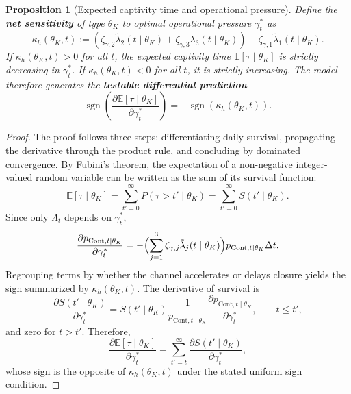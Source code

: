 \documentclass[12pt,a4paper]{article}
\theoremstyle{plain}
\newtheorem{proposition}[theorem]{Proposition}
\theoremstyle{definition}
\theoremstyle{remark}
\newcommand{\1}{\mathbf{1}}
\begin{document}
\begin{proposition}[Expected captivity time and operational pressure]
\label{prop:expected-captivity-gamma}
\label{prop:duracion-presion}
Define the \textbf{net sensitivity} of type $\theta_K$ to optimal operational pressure
$\gamma_t^\ast$ as
\begin{equation}
\label{eq:kappa-c}
\kappa_h(\theta_K,t):=
\left(\zeta_{\gamma,2}\tilde{\lambda}_2(t\mid\theta_K)
+\zeta_{\gamma,3}\tilde{\lambda}_3(t\mid\theta_K)\right)
-\zeta_{\gamma,1}\tilde{\lambda}_1(t\mid\theta_K).
\end{equation}
If $\kappa_h(\theta_K,t)>0$ for all $t$, the expected captivity time
$\mathbb E[\tau\mid\theta_K]$ is strictly decreasing in $\gamma_t^\ast$. If
$\kappa_h(\theta_K,t)<0$ for all $t$, it is strictly increasing. The model therefore
generates the \textbf{testable differential prediction}
\[
\operatorname{sgn}\left(
\frac{\partial\mathbb E[\tau\mid\theta_K]}{\partial\gamma_t^\ast}
\right)
=-\operatorname{sgn}(\kappa_h(\theta_K,t)).
\]
\end{proposition}

\begin{proof}
The proof follows three steps: differentiating daily survival, propagating the
derivative through the product rule, and concluding by dominated convergence.
By Fubini's theorem, the expectation of a non-negative integer-valued random variable
can be written as the sum of its survival function:
\begin{equation}
\label{eq:duracion-identidad}
\mathbb{E}[\tau\mid\theta_K]
=\sum_{t'=0}^{\infty}P(\tau>t'\mid\theta_K)
=\sum_{t'=0}^{\infty}S(t'\mid\theta_K).
\end{equation}
Since only $\Lambda_t$ depends on $\gamma_t^\ast$,
\begin{equation}
\label{eq:dpCont-dgamma}
\frac{\partial p_{\mathrm{Cont},t\mid\theta_K}}{\partial\gamma_t^\ast}
=
-\Bigl(\sum_{j=1}^{3}\zeta_{\gamma,j}\tilde{\lambda}_j(t\mid\theta_K)\Bigr)
p_{\mathrm{Cont},t\mid\theta_K}\Delta t.
\end{equation}
Regrouping terms by whether the channel accelerates or delays closure yields the sign
summarized by $\kappa_h(\theta_K,t)$. The derivative of survival is
\begin{equation}
\label{eq:dS-dgamma}
\frac{\partial S(t'\mid\theta_K)}{\partial\gamma_t^\ast}
=
S(t'\mid\theta_K)
\frac{1}{p_{\mathrm{Cont},t\mid\theta_K}}
\frac{\partial p_{\mathrm{Cont},t\mid\theta_K}}{\partial\gamma_t^\ast},
\qquad t\le t',
\end{equation}
and zero for $t>t'$. Therefore,
\begin{equation}
\label{eq:dE-dgamma}
\frac{\partial\mathbb E[\tau\mid\theta_K]}{\partial\gamma_t^\ast}
=
\sum_{t'=t}^{\infty}
\frac{\partial S(t'\mid\theta_K)}{\partial\gamma_t^\ast},
\end{equation}
whose sign is the opposite of $\kappa_h(\theta_K,t)$ under the stated uniform sign
condition.
\end{proof}
\end{document}
